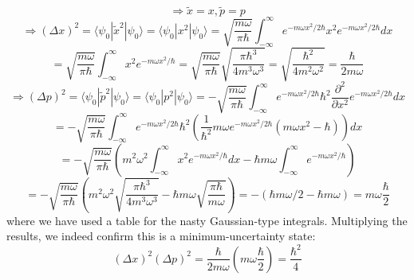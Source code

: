\documentclass{article}
\begin{document}
\[
  \Rightarrow \tilde{x}=x, \tilde{p}=p
\]
\[
  \Rightarrow (\Delta x)^{2}=\langle \psi_{0}|\tilde{x}^{2}|\psi_{0} \rangle=\langle \psi_{0}|x^{2}|\psi_{0} \rangle
  =\sqrt{\frac{m\omega}{\pi\hbar}}\int_{-\infty}^{\infty}e^{-m\omega x^{2}/2\hbar}x^{2}e^{-m\omega x^{2}/2\hbar}dx
\]
\[
  =\sqrt{\frac{m\omega}{\pi\hbar}}\int_{-\infty}^{\infty}x^{2}e^{-m\omega x^{2}/\hbar}
  =\sqrt{\frac{m\omega}{\pi\hbar}}\sqrt{\frac{\pi\hbar^{3}}{4m^{3}\omega^{3}}}
  =\sqrt{\frac{\hbar^{2}}{4m^{2}\omega^{2}}}=\frac{\hbar}{2m\omega}
\]
\[
  \Rightarrow (\Delta p)^{2}=\langle \psi_{0}|\tilde{p}^{2}|\psi_{0} \rangle=\langle \psi_{0}|p^{2}|\psi_{0} \rangle
  =-\sqrt{\frac{m\omega}{\pi\hbar}}\int_{-\infty}^{\infty}e^{-m\omega x^{2}/2\hbar}\hbar^{2}\frac{\partial^{2}}{\partial x^{2}}
  e^{-m\omega x^{2}/2\hbar}dx
\]
\[
  =-\sqrt{\frac{m\omega}{\pi\hbar}}\int_{-\infty}^{\infty}e^{-m\omega x^{2}/2\hbar}
  \hbar^{2}\left( \frac{1}{\hbar^{2}} m\omega e^{-m\omega x^{2}/2\hbar}(m\omega x^{2}-\hbar)\right)dx
\]
\[
  =-\sqrt{\frac{m\omega}{\pi\hbar}}\left( m^{2}\omega^{2}\int_{-\infty}^{\infty}x^{2}e^{-m\omega x^{2}/\hbar}dx
    -\hbar m\omega\int_{-\infty}^{\infty}e^{-m\omega x^{2}/\hbar}\right)
\]
\[
  =-\sqrt{\frac{m\omega}{\pi\hbar}}\left( m^{2}\omega^{2}\sqrt{\frac{\pi \hbar^{3}}{4m^{3}\omega^{3}}}
    -\hbar m\omega\sqrt{\frac{\pi\hbar}{m\omega}} \right)
  =-(\hbar m\omega/2-\hbar m\omega)=m\omega\frac{\hbar}{2}
\]
where we have used a table for the nasty Gaussian-type integrals.
Multiplying the results, we indeed confirm this is a minimum-uncertainty state:
\[
  (\Delta x)^{2}(\Delta p)^{2}=\frac{\hbar}{2m\omega}\left( m\omega\frac{\hbar}{2}\right)=\frac{\hbar^{2}}{4}
\]
\end{document}
